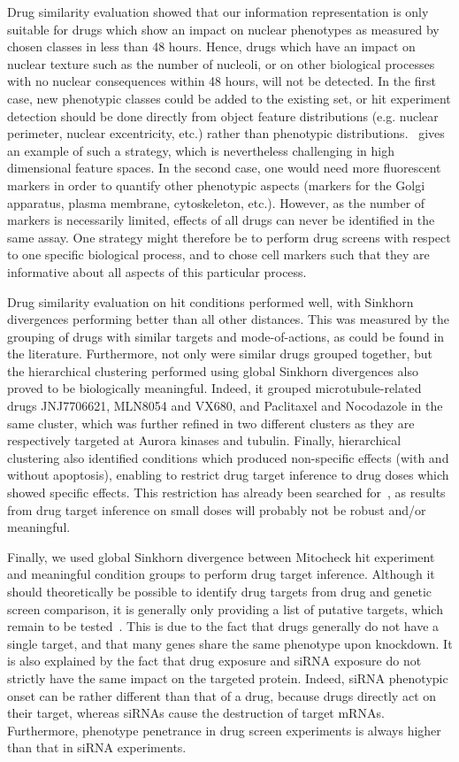 Drug similarity evaluation showed that our information representation
is only suitable for drugs which show an impact on nuclear phenotypes
as measured by chosen classes in less than 48 hours. Hence, drugs
which have an impact on nuclear texture such as the number of
nucleoli, or on other biological processes with no nuclear
consequences within 48 hours, will not be detected. In the first case,
new phenotypic classes could be added to the existing set, or hit
experiment detection should be done directly from object feature
distributions (e.g. nuclear perimeter, nuclear excentricity, etc.)
rather than phenotypic distributions.~\cite{pmid18066055} gives an example of such a strategy, which is nevertheless challenging in high dimensional feature spaces. In the second case, one would need more
fluorescent markers in order to quantify other phenotypic aspects
(markers for the Golgi apparatus, plasma membrane, cytoskeleton, etc.). However,
as the number of markers is necessarily limited, effects of all drugs can never be identified in the same assay. One strategy might therefore be to perform drug screens with respect to one specific biological process, and to chose cell markers such that they are informative about all aspects of this particular process. 

Drug similarity evaluation on hit conditions performed well, with Sinkhorn divergences performing better than all other distances. This was measured by the grouping of drugs with similar targets and mode-of-actions, as could be found in the literature. Furthermore, not only were similar drugs grouped together, but the hierarchical clustering performed using global Sinkhorn divergences also proved to be biologically meaningful. Indeed, it grouped microtubule-related drugs JNJ7706621, MLN8054 and VX680, and Paclitaxel and Nocodazole in the same cluster, which was further refined in two different clusters as they are respectively targeted at Aurora kinases and tubulin. Finally, hierarchical clustering also identified conditions which produced non-specific effects (with and without apoptosis), enabling to restrict drug target inference to drug doses which showed specific effects. This restriction has already been searched for~\cite{pmid17401369}, as results from drug target inference on small doses will probably not be robust and/or meaningful.

Finally, we used global Sinkhorn divergence between Mitocheck hit
experiment and meaningful condition groups to perform drug target
inference. Although it should theoretically be possible to identify
drug targets from drug and genetic screen comparison, it is generally
only providing a list of putative targets, which remain to be tested~\cite{pmid23508189}. 
This is due to the fact that drugs generally do not
have a single target, and that many genes share the same phenotype upon knockdown. 
It is also explained by the fact that
drug exposure and siRNA exposure do not strictly have the same impact
on the targeted protein. Indeed, siRNA phenotypic onset can be rather
different than that of a drug, because drugs directly act on their
target, whereas siRNAs cause the destruction of target mRNAs. Furthermore, phenotype penetrance in drug screen experiments is always higher than that in siRNA experiments. 

